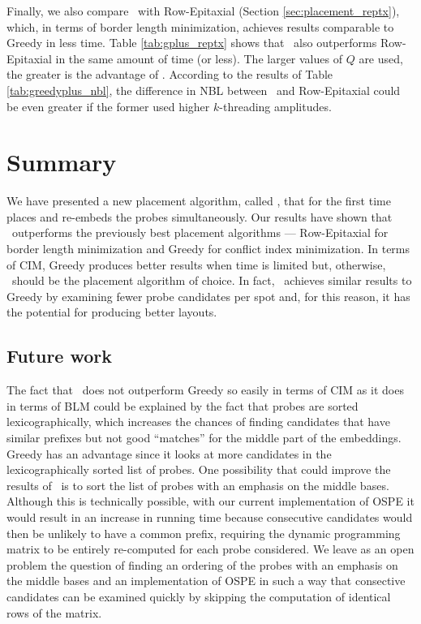 Finally, we also compare \Greedyplus\ with Row-Epitaxial (Section
\ref{sec:placement_reptx}), which, in terms of border length minimization,
achieves results comparable to Greedy in less time. Table \ref{tab:gplus_reptx}
shows that \Greedyplus\ also outperforms Row-Epitaxial in the same amount of
time (or less). The larger values of $Q$ are used, the greater is the advantage
of \Greedyplus. According to the results of Table \ref{tab:greedyplus_nbl}, the
difference in NBL between \Greedyplus\ and Row-Epitaxial could be even greater
if the former used higher $k$-threading amplitudes.

\section{Summary}
\label{sec:merge_summary}

We have presented a new placement algorithm, called \Greedyplus, that for the
first time places and re-embeds the probes simultaneously. Our results have
shown that \Greedyplus\ outperforms the previously best placement algorithms ---
Row-Epitaxial for border length minimization and Greedy for conflict index
minimization. In terms of CIM, Greedy produces better results when time is
limited but, otherwise, \Greedyplus\ should be the placement algorithm of
choice. In fact, \Greedyplus\ achieves similar results to Greedy by examining
fewer probe candidates per spot and, for this reason, it has the potential for
producing better layouts.

\subsection{Future work}

The fact that \Greedyplus\ does not outperform Greedy so easily in terms of CIM
as it does in terms of BLM could be explained by the fact that probes are sorted
lexicographically, which increases the chances of finding candidates that have
similar prefixes but not good ``matches'' for the middle part of the embeddings.
Greedy has an advantage since it looks at more candidates in the
lexicographically sorted list of probes. One possibility that could improve the
results of \Greedyplus\ is to sort the list of probes with an emphasis on the
middle bases. Although this is technically possible, with our current
implementation of OSPE it would result in an increase in running time because
consecutive candidates would then be unlikely to have a common prefix, requiring
the dynamic programming matrix to be entirely re-computed for each probe
considered. We leave as an open problem the question of finding an ordering of
the probes with an emphasis on the middle bases and an implementation of OSPE in
such a way that consective candidates can be examined quickly by skipping the
computation of identical rows of the matrix.
